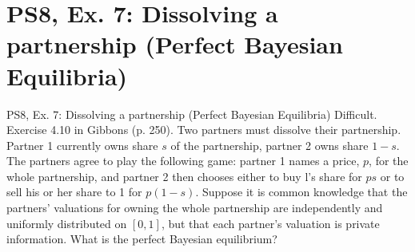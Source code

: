 \section{PS8, Ex. 7: Dissolving a partnership (Perfect Bayesian Equilibria)}

\begin{frame}{PS8, Ex. 7: Dissolving a partnership (Perfect Bayesian Equilibria)}
    Difficult. Exercise 4.10 in Gibbons (p. 250). Two partners must dissolve their partnership. Partner 1 currently owns share $s$ of the partnership, partner 2 owns share $1-s$. The partners agree to play the following game: partner 1 names a price, $p$, for the whole partnership, and partner 2 then chooses either to buy l's share for $ps$ or to sell his or her share to 1 for $p(1-s)$. Suppose it is common knowledge that the partners' valuations for owning the whole partnership are independently and uniformly distributed on $[0,1]$, but that each partner's valuation is private information. What is the perfect Bayesian equilibrium?
    \begin{multicols}{2}
      \vfill\null\columnbreak
      \vfill\null
    \end{multicols}
\end{frame}
